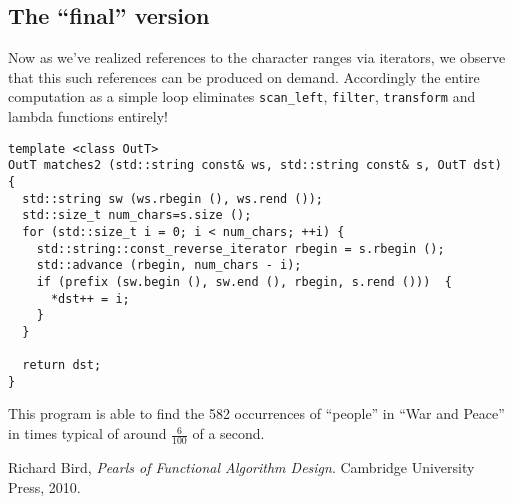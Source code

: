 \documentclass{article}
\begin{document}
\subsection{The ``final'' version}
Now as we've realized references to the character ranges via
iterators, we observe that this such references can be produced on
demand. Accordingly the entire computation as a simple loop eliminates
\verb|scan_left|, \verb|filter|, \verb|transform| and lambda functions
entirely!
\begin{verbatim}
template <class OutT>
OutT matches2 (std::string const& ws, std::string const& s, OutT dst) {
  std::string sw (ws.rbegin (), ws.rend ());
  std::size_t num_chars=s.size ();
  for (std::size_t i = 0; i < num_chars; ++i) {
    std::string::const_reverse_iterator rbegin = s.rbegin ();
    std::advance (rbegin, num_chars - i);
    if (prefix (sw.begin (), sw.end (), rbegin, s.rend ()))  {
      *dst++ = i;
    }
  }

  return dst;
}
\end{verbatim}
This program is able to find the 582 occurrences of ``people'' in
``War and Peace'' in times typical of around $\frac{6}{100}$ of a
second.
\begin{thebibliography}{9}
Richard Bird,
\textit{Pearls of Functional Algorithm Design}. 
Cambridge University Press, 2010.
\end{thebibliography}
\end{document}
